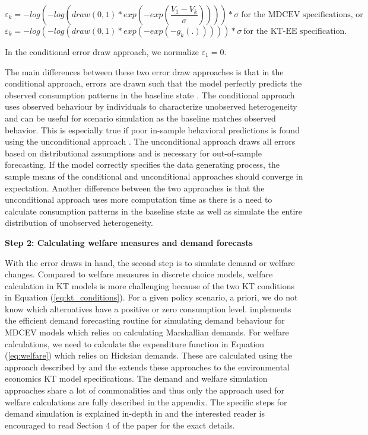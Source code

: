 \begin{equation}
\varepsilon_k = -log(-log(draw(0, 1) * exp(-exp(\frac{V_1 - V_k}{\sigma})))) * \sigma \; \mbox{for the MDCEV specifications, or}
\end{equation} \begin{equation}
\varepsilon_k = -log(-log(draw(0, 1) * exp(-exp(-g_k(.))))) * \sigma \: \mbox{for the KT-EE specification.}
\end{equation}

In the conditional error draw approach, we normalize
\(\varepsilon_1=0\).

The main differences between these two error draw approaches is that in
the conditional approach, errors are drawn such that the model perfectly
predicts the observed consumption patterns in the baseline state
\citep{vonhaefenkuhn-tucker2005}. The conditional approach uses observed
behaviour by individuals to characterize unobserved heterogeneity and
can be useful for scenario simulation as the baseline matches observed
behavior. This is especially true if poor in-sample behavioral
predictions is found using the unconditional approach
\citep{vonhaefenincorporating2003}. The unconditional approach draws all
errors based on distributional assumptions and is necessary for
out-of-sample forecasting. If the model correctly specifies the data
generating process, the sample means of the conditional and
unconditional approaches should converge in expectation. Another
difference between the two approaches is that the unconditional approach
uses more computation time as there is a need to calculate consumption
patterns in the baseline state as well as simulate the entire
distribution of unobserved heterogeneity.

\textbf{Step 2: Calculating welfare measures and demand forecasts}

With the error draws in hand, the second step is to simulate demand or
welfare changes. Compared to welfare measures in discrete choice models,
welfare calculation in KT models is more challenging because of the two
KT conditions in Equation (\ref{eq:kt_conditions}). For a given policy
scenario, a priori, we do not know which alternatives have a positive or
zero consumption level.  implements the
\citet{pinjaricomputationally2011} efficient demand forecasting routine
for simulating demand behaviour for MDCEV models which relies on
calculating Marshallian demands. For welfare calculations, we need to
calculate the expenditure function in Equation (\ref{eq:welfare}) which
relies on Hicksian demands. These are calculated using the approach
described by \citet{lloydsmithnew2018} and the  extends
these approaches to the environmental economics KT model specifications.
The demand and welfare simulation approaches share a lot of
commonalities and thus only the approach used for welfare calculations
are fully described in the appendix. The specific steps for demand
simulation is explained in-depth in \citet{pinjaricomputationally2011}
and the interested reader is encouraged to read Section 4 of the paper
for the exact details.

